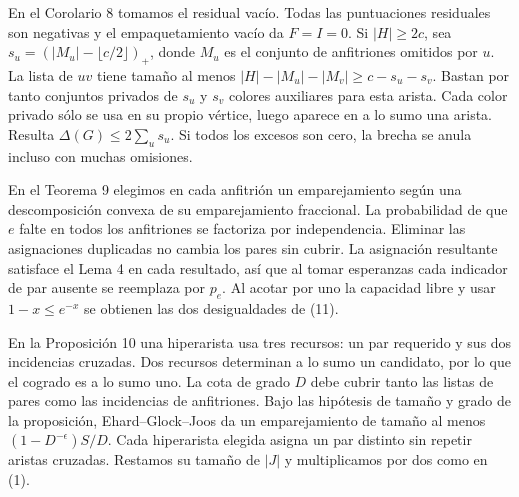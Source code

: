 \documentclass[spanish,11pt,a4paper]{article}
\begin{document}
En el Corolario 8 tomamos el residual vacío. Todas las puntuaciones residuales son negativas y el empaquetamiento vacío da \(F=I=0\). Si \(|H|\ge2c\), sea \(s_u=(|M_u|-\lfloor c/2\rfloor)_+\), donde \(M_u\) es el conjunto de anfitriones omitidos por \(u\). La lista de \(uv\) tiene tamaño al menos \(|H|-|M_u|-|M_v|\ge c-s_u-s_v\). Bastan por tanto conjuntos privados de \(s_u\) y \(s_v\) colores auxiliares para esta arista. Cada color privado sólo se usa en su propio vértice, luego aparece en a lo sumo una arista. Resulta \(\Delta(G)\le2\sum_u s_u\). Si todos los excesos son cero, la brecha se anula incluso con muchas omisiones.

En el Teorema 9 elegimos en cada anfitrión un emparejamiento según una descomposición convexa de su emparejamiento fraccional. La probabilidad de que \(e\) falte en todos los anfitriones se factoriza por independencia. Eliminar las asignaciones duplicadas no cambia los pares sin cubrir. La asignación resultante satisface el Lema 4 en cada resultado, así que al tomar esperanzas cada indicador de par ausente se reemplaza por \(p_e\). Al acotar por uno la capacidad libre y usar \(1-x\le e^{-x}\) se obtienen las dos desigualdades de (11).

En la Proposición 10 una hiperarista usa tres recursos: un par requerido y sus dos incidencias cruzadas. Dos recursos determinan a lo sumo un candidato, por lo que el cogrado es a lo sumo uno. La cota de grado \(D\) debe cubrir tanto las listas de pares como las incidencias de anfitriones. Bajo las hipótesis de tamaño y grado de la proposición, Ehard--Glock--Joos da un emparejamiento de tamaño al menos \((1-D^{-\epsilon})S/D\). Cada hiperarista elegida asigna un par distinto sin repetir aristas cruzadas. Restamos su tamaño de \(|J|\) y multiplicamos por dos como en (1).
\end{document}
